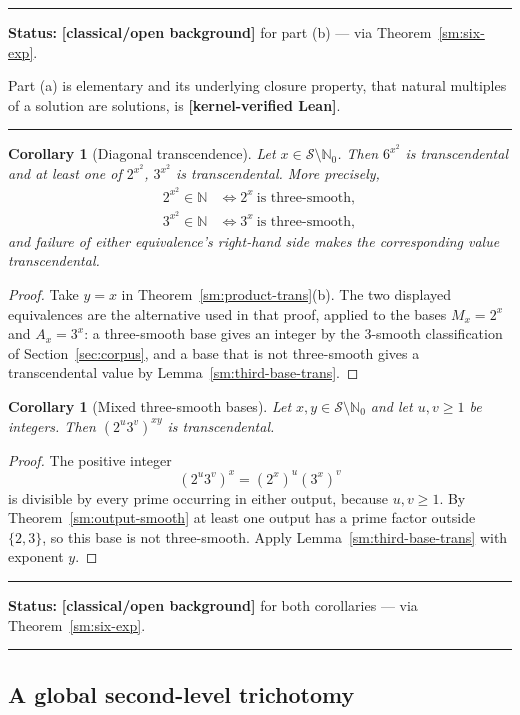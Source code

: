 \documentclass[11pt,oneside]{article}
\newtheorem{corollary}[theorem]{Corollary}
\theoremstyle{definition}
\theoremstyle{remark}
\newcommand{\N}{\mathbb N}
\newcommand{\Nzero}{\mathbb N_0}
\newcommand{\Sol}{\mathcal S}
\newcommand{\statuslean}{\textcolor{leanblue}{\textbf{[kernel-verified Lean]}}}
\newcommand{\statusknown}{\textcolor{classicalgray}{\textbf{[classical/\allowbreak open background]}}}
\newenvironment{statusbox}[1]
{\begin{center}\begin{minipage}{0.94\textwidth}\raggedright\hbadness=10000\hrule
\vspace{0.45em}\textbf{Status:} #1\par\vspace{0.35em}}
{\vspace{0.35em}\hrule\end{minipage}\end{center}}
\begin{document}
\begin{statusbox}{\statusknown{} for part (b) --- via Theorem~\ref{sm:six-exp}.}
Part (a) is elementary and its underlying closure property, that natural multiples of a
solution are solutions, is \statuslean{}.
\end{statusbox}

\begin{corollary}[Diagonal transcendence]
\label{sm:diagonal-trans}
Let $x\in\Sol\setminus\Nzero$.  Then $6^{x^2}$ is transcendental and at least one of
$2^{x^2}$, $3^{x^2}$ is transcendental.  More precisely,
\[
\begin{aligned}
 2^{x^2}\in\N &\iff 2^x\ \text{is three-smooth},\\
 3^{x^2}\in\N &\iff 3^x\ \text{is three-smooth},
\end{aligned}
\]
and failure of either equivalence's right-hand side makes the corresponding value
transcendental.
\end{corollary}

\begin{proof}
Take $y=x$ in Theorem~\ref{sm:product-trans}(b).  The two displayed equivalences are the
alternative used in that proof, applied to the bases $M_x=2^x$ and $A_x=3^x$: a three-smooth
base gives an integer by the $3$-smooth classification of Section~\ref{sec:corpus}, and a
base that is not three-smooth gives a transcendental value by
Lemma~\ref{sm:third-base-trans}.
\end{proof}

\begin{corollary}[Mixed three-smooth bases]
\label{sm:mixed-base-trans}
Let $x,y\in\Sol\setminus\Nzero$ and let $u,v\ge1$ be integers.  Then $(2^u3^v)^{xy}$ is
transcendental.
\end{corollary}

\begin{proof}
The positive integer
\[
 (2^u3^v)^x=(2^x)^u(3^x)^v
\]
is divisible by every prime occurring in either output, because $u,v\ge1$.  By
Theorem~\ref{sm:output-smooth} at least one output has a prime factor outside $\{2,3\}$, so
this base is not three-smooth.  Apply Lemma~\ref{sm:third-base-trans} with exponent $y$.
\end{proof}

\begin{statusbox}{\statusknown{} for both corollaries --- via Theorem~\ref{sm:six-exp}.}
\end{statusbox}

\subsection{A global second-level trichotomy}
\end{document}
